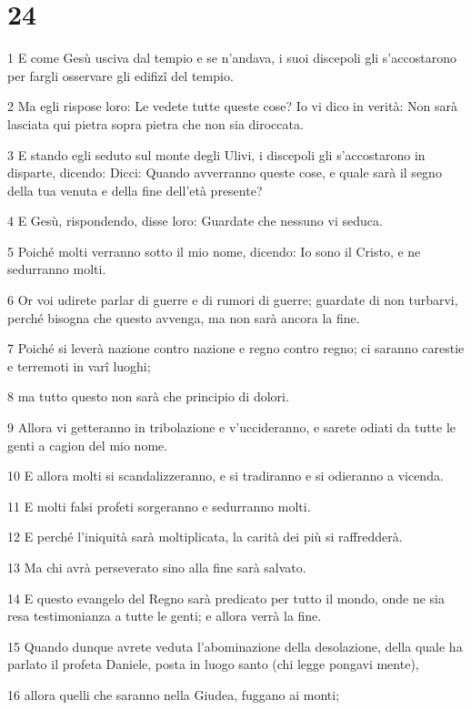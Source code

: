 \chapter{24}

\par 1 E come Gesù usciva dal tempio e se n'andava, i suoi discepoli gli s'accostarono per fargli osservare gli edifizî del tempio.
\par 2 Ma egli rispose loro: Le vedete tutte queste cose? Io vi dico in verità: Non sarà lasciata qui pietra sopra pietra che non sia diroccata.
\par 3 E stando egli seduto sul monte degli Ulivi, i discepoli gli s'accostarono in disparte, dicendo: Dicci: Quando avverranno queste cose, e quale sarà il segno della tua venuta e della fine dell'età presente?
\par 4 E Gesù, rispondendo, disse loro: Guardate che nessuno vi seduca.
\par 5 Poiché molti verranno sotto il mio nome, dicendo: Io sono il Cristo, e ne sedurranno molti.
\par 6 Or voi udirete parlar di guerre e di rumori di guerre; guardate di non turbarvi, perché bisogna che questo avvenga, ma non sarà ancora la fine.
\par 7 Poiché si leverà nazione contro nazione e regno contro regno; ci saranno carestie e terremoti in varî luoghi;
\par 8 ma tutto questo non sarà che principio di dolori.
\par 9 Allora vi getteranno in tribolazione e v'uccideranno, e sarete odiati da tutte le genti a cagion del mio nome.
\par 10 E allora molti si scandalizzeranno, e si tradiranno e si odieranno a vicenda.
\par 11 E molti falsi profeti sorgeranno e sedurranno molti.
\par 12 E perché l'iniquità sarà moltiplicata, la carità dei più si raffredderà.
\par 13 Ma chi avrà perseverato sino alla fine sarà salvato.
\par 14 E questo evangelo del Regno sarà predicato per tutto il mondo, onde ne sia resa testimonianza a tutte le genti; e allora verrà la fine.
\par 15 Quando dunque avrete veduta l'abominazione della desolazione, della quale ha parlato il profeta Daniele, posta in luogo santo (chi legge pongavi mente),
\par 16 allora quelli che saranno nella Giudea, fuggano ai monti;
